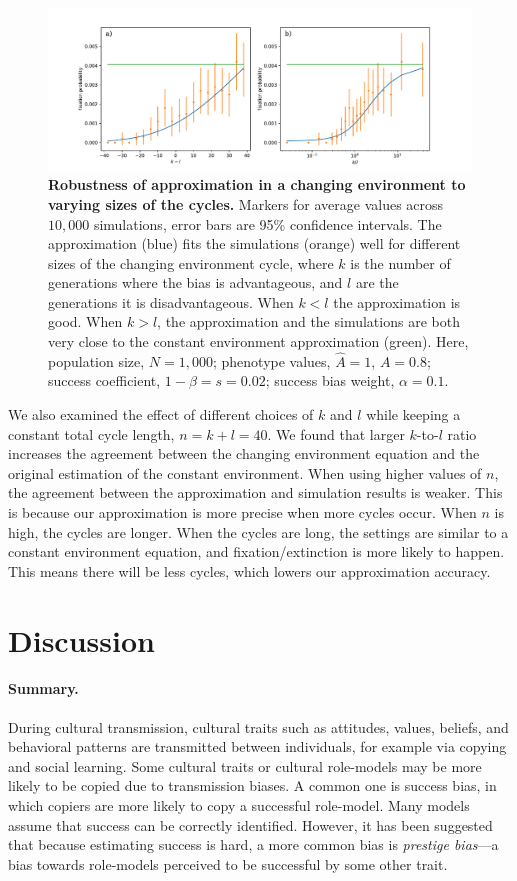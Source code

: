 \documentclass[12pt]{extarticle}
\begin{document}
\begin{figure}[h]
    \includegraphics[width=\linewidth]{../figures/changed_env/ch_env_var_k_l.pdf}
  \caption{\textbf{Robustness of approximation in a changing environment to varying sizes of the cycles.} 
Markers for average values across $10,000$ simulations, error bars are 95\% confidence intervals.
The approximation (blue) fits the simulations (orange) well for different sizes of the changing environment cycle, where $k$ is the number of generations where the bias is advantageous, and $l$ are the generations it is disadvantageous.
   When $k<l$ the approximation is good. When $k>l$, the approximation and the simulations are both very close to the constant environment approximation (green). 
 Here, population size, $N=1,000$; phenotype values, $\hat{A}=1$, $A=0.8$; success coefficient, $1-\beta=s=0.02$; success bias weight, $\alpha=0.1$.}
  \label{fig:ch_env_k_l}
\end{figure}

We also examined the effect of different choices of $k$ and $l$ while keeping a constant total cycle length, $n=k+l=40$.
We found that larger $k$-to-$l$ ratio increases the agreement between the changing environment equation and the original estimation of the constant environment. 
When using higher values of $n$, the agreement between the approximation and simulation results is weaker.
This is because our approximation is more precise when more cycles occur.
When $n$ is high, the cycles are longer. When the cycles are long, the settings are similar to a constant environment equation, and fixation/extinction is more likely to happen. This means there will be less cycles, which lowers our approximation accuracy.

\section*{Discussion}
\paragraph{Summary.}
During cultural transmission, cultural traits such as attitudes, values, beliefs, and behavioral patterns are transmitted between individuals, for example via copying and social learning.
Some cultural traits or cultural role-models may be more likely to be copied due to transmission biases. 
A common one is success bias, in which copiers are more likely to copy a successful role-model. Many models assume that success can be correctly identified.
However, it has been suggested \citep{complexityPaper} that because estimating success is hard, a more common bias is \textit{prestige bias}---a bias towards role-models perceived to be successful by some other trait.
\end{document}
